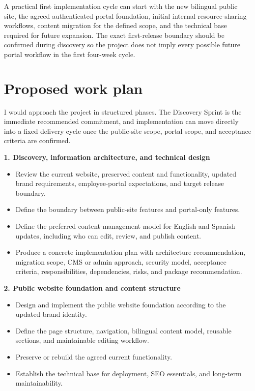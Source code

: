 \documentclass[11pt,a4paper]{article}
\begin{document}
A practical first implementation cycle can start with the new bilingual public site, the agreed authenticated portal foundation, initial internal resource-sharing workflows, content migration for the defined scope, and the technical base required for future expansion. The exact first-release boundary should be confirmed during discovery so the project does not imply every possible future portal workflow in the first four-week cycle.\par

\section*{Proposed work plan}

I would approach the project in structured phases. The Discovery Sprint is the immediate recommended commitment, and implementation can move directly into a fixed delivery cycle once the public-site scope, portal scope, and acceptance criteria are confirmed.\par

\textbf{1. Discovery, information architecture, and technical design}\par

\begin{itemize}
\item Review the current website, preserved content and functionality, updated brand requirements, employee-portal expectations, and target release boundary.
\item Define the boundary between public-site features and portal-only features.
\item Define the preferred content-management model for English and Spanish updates, including who can edit, review, and publish content.
\item Produce a concrete implementation plan with architecture recommendation, migration scope, CMS or admin approach, security model, acceptance criteria, responsibilities, dependencies, risks, and package recommendation.
\end{itemize}

\textbf{2. Public website foundation and content structure}\par

\begin{itemize}
\item Design and implement the public website foundation according to the updated brand identity.
\item Define the page structure, navigation, bilingual content model, reusable sections, and maintainable editing workflow.
\item Preserve or rebuild the agreed current functionality.
\item Establish the technical base for deployment, SEO essentials, and long-term maintainability.
\end{itemize}
\end{document}
